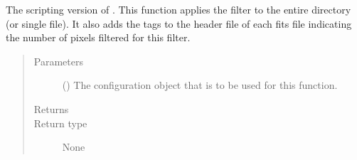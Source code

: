 \documentclass[letterpaper,10pt,english]{sphinxmanual}
\begin{document}

\begin{fulllineitems}
\label{\detokenize{docstrings/ifa_smeargle.masking.scripting:ifa_smeargle.masking.scripting.script_filter_pixel_truncation}}
The scripting version of . This
function applies the filter to the entire directory (or single
file). It also adds the tags to the header file of each fits file
indicating the number of pixels filtered for this filter.
\begin{quote}\begin{description}
\item[{Parameters}] \leavevmode
{} () \textendash{} The configuration object that is to be used for this
function.

\item[{Returns}] \leavevmode


\item[{Return type}] \leavevmode
None

\end{description}\end{quote}

\end{fulllineitems}

\end{document}
